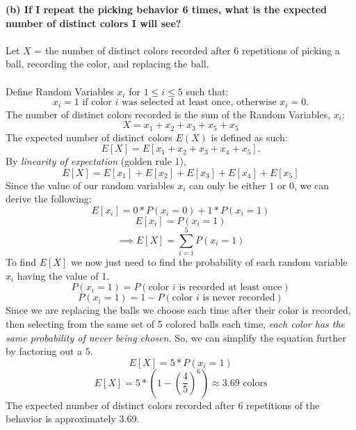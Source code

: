 \documentclass[titlepage]{article}
\begin{document}
\noindent\textbf{(b) If I repeat the picking behavior 6 times, what is the expected number of distinct colors I will see?}\\
\\
Let $X$ = the number of distinct colors recorded after 6 repetitions of picking a ball, recording the color, and replacing the ball.\\
\\
Define Random Variables $x_i$ for $1 \leq i \leq 5$ such that:\\
    \[x_i = 1 \mbox{ if color $i$ was selected at least once, otherwise $x_i = 0$.}\]
The number of distinct colors recorded is the sum of the Random Variables, $x_i$:
    \[X = x_1 + x_2 + x_3 + x_5 + x_5\]
The expected number of distinct colors $E(X)$ is defined as such:\\
    \[E[X] = E[x_1 + x_2 + x_3 + x_4 + x_5].\]
By \emph{linearity of expectation} (golden rule 1),
    \[E[X] = E[x_1] + E[x_2] + E[x_3] + E[x_4] + E[x_5]\]
Since the value of our random variables $x_i$ can only be either $1$ or $0$, we can derive the following:
    \[E[x_i] = 0 * P(x_i = 0) + 1 * P(x_i = 1)\]
    \[E[x_i] = P(x_i = 1)\]
    \[\implies E[X] = \sum_{i=1}^{5}P(x_i = 1)\]
To find $E[X]$ we now just need to find the probability of each random variable $x_i$ having the value of 1.
    \[P(x_i = 1) = P(\mbox{color $i$ is recorded at least once})\]
    \[P(x_i = 1) = 1 - P(\mbox{color $i$ is never recorded})\]
Since we are replacing the balls we choose each time after their color is recorded, then selecting from the same set of 5 colored balls each time, \emph{each color has the same probability of never being chosen.} So, we can simplify the equation further by factoring out a $5$.
        \[E[X] = 5 * P(x_i = 1)\]
        \[E[X] = 5 * (1 - (\frac{4}{5})^6) \approx 3.69 \text{ colors}\]
The expected number of distinct colors recorded after 6 repetitions of the behavior is approximately 3.69.
\end{document}
